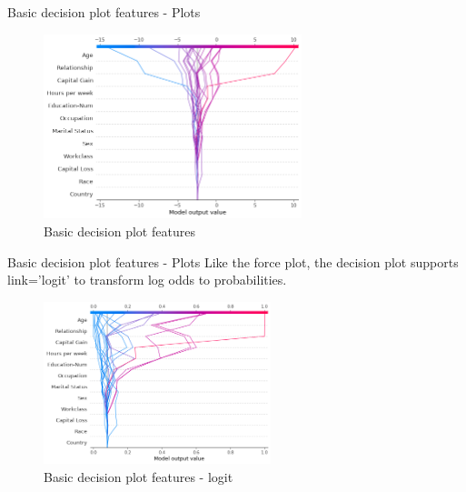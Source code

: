 \documentclass[aspectratio=169]{beamer}
\begin{document}
\begin{frame}{Basic decision plot features - Plots}
    \begin{figure}[htbp]
        \centering
        \includegraphics[width=0.67\textwidth]{figs/shap/plots/decision/example_notebooks_api_examples_plots_decision_plot_8_0.png}
        \caption{Basic decision plot features}
        \label{fig:basic-decision}
    \end{figure}
\end{frame}

\begin{frame}{Basic decision plot features - Plots}
Like the force plot, the decision plot supports link='logit' to transform log odds to probabilities.
    \begin{figure}[htbp]
        \centering
        \includegraphics[width=0.59\textwidth]{figs/shap/plots/decision/example_notebooks_api_examples_plots_decision_plot_10_0.png}
        \caption{Basic decision plot features - logit}
        \label{fig:logit-decision}
    \end{figure}
\end{frame}
\end{document}
